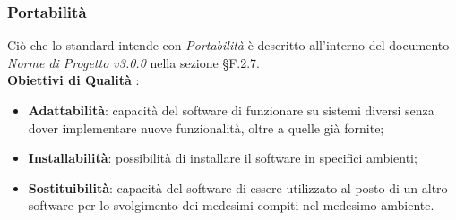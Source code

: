 \subsubsection{Portabilità}

Ciò che lo standard intende con \textit{Portabilità} è descritto all'interno del documento \textit{Norme di Progetto v3.0.0} nella sezione §F.2.7. \\

\textbf{Obiettivi di Qualità} :

\begin{itemize}
	\item \textbf{Adattabilità}: capacità del software di funzionare su sistemi diversi senza dover implementare nuove funzionalità, oltre a quelle già fornite;
	\item \textbf{Installabilità}: possibilità di installare il software in specifici ambienti;
	\item \textbf{Sostituibilità}: capacità del software di essere utilizzato al posto di un altro software per lo svolgimento dei medesimi compiti nel medesimo ambiente.
\end{itemize}


